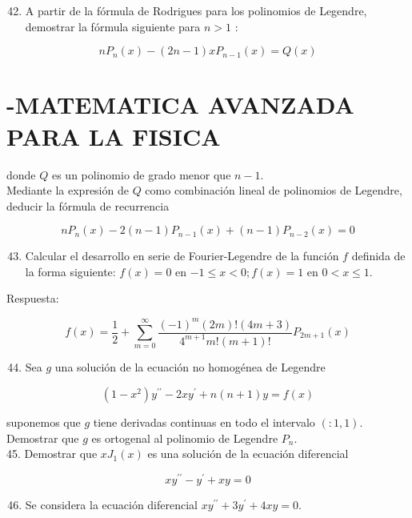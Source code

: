 \documentclass[10pt]{article}
\theoremstyle{plain}
\theoremstyle{definition}
\theoremstyle{remark}
\begin{document}
\begin{enumerate}
  \setcounter{enumi}{41}
  \item A partir de la fórmula de Rodrigues para los polinomios de Legendre, demostrar la fórmula siguiente para $n>1$ :
\end{enumerate}

$$
n P_{n}(x)-(2 n-1) x P_{n-1}(x)=Q(x)
$$

\section*{-MATEMATICA AVANZADA PARA LA FISICA}
donde $Q$ es un polinomio de grado menor que $n-1$.\\
Mediante la expresión de $Q$ como combinación lineal de polinomios de Legendre, deducir la fórmula de recurrencia

$$
n P_{n}(x)-2(n-1) P_{n-1}(x)+(n-1) P_{n-2}(x)=0
$$

\begin{enumerate}
  \setcounter{enumi}{42}
  \item Calcular el desarrollo en serie de Fourier-Legendre de la función $f$ definida de la forma siguiente: $f(x)=0$ en $-1 \leqslant x<0 ; f(x)=1$ en $0<x \leqslant 1$.
\end{enumerate}

Respuesta:

$$
f(x)=\frac{1}{2}+\sum_{m=0}^{\infty} \frac{(-1)^{m}(2 m)!(4 m+3)}{4^{m+1} m!(m+1)!} P_{2 m+1}(x)
$$

\begin{enumerate}
  \setcounter{enumi}{43}
  \item Sea $g$ una solución de la ecuación no homogénea de Legendre
\end{enumerate}

$$
\left(1-x^{2}\right) y^{\prime \prime}-2 x y^{\prime}+n(n+1) y=f(x)
$$

suponemos que $g$ tiene derivadas continuas en todo el intervalo $(: 1,1)$.\\
Demostrar que $g$ es ortogenal al polinomio de Legendre $P_{n}$.\\
45. Demostrar que $x J_{1}(x)$ es una solución de la ecuación diferencial

$$
x y^{\prime \prime}-y^{\prime}+x y=0
$$

\begin{enumerate}
  \setcounter{enumi}{45}
  \item Se considera la ecuación diferencial $x y^{\prime \prime}+3 y^{\prime}+4 x y=0$.
\end{enumerate}
\end{document}
